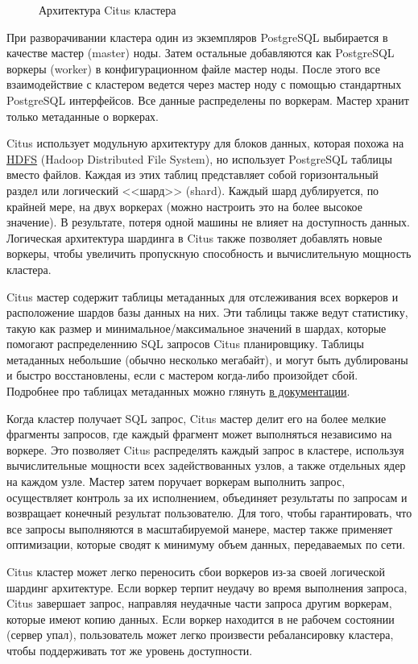 \begin{figure}[ht!]
  \caption{Архитектура Citus кластера}
  \label{fig:citus_basic_arch}
\end{figure}

При разворачивании кластера один из экземпляров PostgreSQL выбирается в качестве мастер (master) ноды. Затем остальные добавляются как PostgreSQL воркеры (worker) в конфигурационном файле мастер ноды. После этого все взаимодействие с кластером ведется через мастер ноду с помощью стандартных PostgreSQL интерфейсов. Все данные распределены по воркерам. Мастер хранит только  метаданные о воркерах.

Citus использует модульную архитектуру для блоков данных, которая похожа на \href{https://ru.wikipedia.org/wiki/Hadoop#HDFS}{HDFS} (Hadoop Distributed File System), но использует PostgreSQL таблицы вместо файлов. Каждая из этих таблиц представляет собой горизонтальный раздел или логический <<шард>> (shard). Каждый шард дублируется, по крайней мере, на двух воркерах (можно настроить это на более высокое значение). В результате, потеря одной машины не влияет на доступность данных. Логическая архитектура шардинга в Citus также позволяет добавлять новые воркеры, чтобы увеличить пропускную способность и вычислительную мощность кластера.

Citus мастер содержит таблицы метаданных для отслеживания всех воркеров и расположение шардов базы данных на них. Эти таблицы также ведут статистику, такую как размер и минимальное/максимальное значений в шардах, которые помогают распределеннию SQL запросов Citus планировщику. Таблицы метаданных небольшие (обычно несколько мегабайт), и могут быть дублированы и быстро восстановлены, если с мастером когда-либо произойдет сбой. Подробнее про таблицах метаданных можно глянуть \href{https://docs.citusdata.com/en/v5.1/reference/metadata_tables.html}{в документации}.

Когда кластер получает SQL запрос, Citus мастер делит его на более мелкие фрагменты запросов, где каждый фрагмент может выполняться независимо на воркере. Это позволяет Citus распределять каждый запрос в кластере, используя вычислительные мощности всех задействованных узлов, а также отдельных ядер на каждом узле. Мастер затем поручает воркерам выполнить запрос, осуществляет контроль за их исполнением, объединяет результаты по запросам и возвращает конечный результат пользователю. Для того, чтобы гарантировать, что все запросы выполняются в масштабируемой манере, мастер также применяет оптимизации, которые сводят к минимуму объем данных, передаваемых по сети.

Citus кластер может легко переносить сбои воркеров из-за своей логической шардинг архитектуре. Если воркер терпит неудачу во время выполнения запроса, Citus завершает запрос, направляя неудачные части запроса другим воркерам, которые имеют копию данных. Если воркер находится в не рабочем состоянии (сервер упал), пользователь может легко произвести ребалансировку кластера, чтобы поддерживать тот же уровень доступности.


